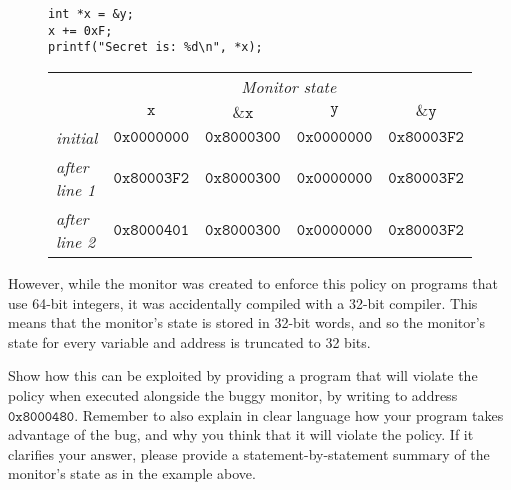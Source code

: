 \documentclass[10pt]{article}
\begin{document}
\begin{enumerate}
\begin{figure}[h]
\begin{minipage}{0.35\textwidth}
\begin{verbatim}
int *x = &y;
x += 0xF;
printf("Secret is: %d\n", *x);
\end{verbatim}
\end{minipage}
\begin{minipage}{0.45\textwidth}
\begin{tabular}{lcccc}
& \multicolumn{4}{c}{\emph{Monitor state}} \\
& $\mathtt{x}$ & $\mathtt{\&x}$ & $\mathtt{y}$ & $\mathtt{\&y}$ \\
\hline
\emph{initial} & $\mathtt{0x0000000}$ & $\mathtt{0x8000300}$ & $\mathtt{0x0000000}$ & $\mathtt{0x80003F2}$ \\
\emph{after line 1} &  $\mathtt{0x80003F2}$ & $\mathtt{0x8000300}$ & $\mathtt{0x0000000}$ & $\mathtt{0x80003F2}$ \\
\emph{after line 2} &  $\mathtt{0x8000401}$ & $\mathtt{0x8000300}$ & $\mathtt{0x0000000}$ & $\mathtt{0x80003F2}$
\end{tabular}
\end{minipage}
\end{figure}

However, while the monitor was created to enforce this policy on programs that use 64-bit integers, it was accidentally compiled with a 32-bit compiler.
This means that the monitor's state is stored in 32-bit words, and so the monitor's state for every variable and address is truncated to 32 bits.

Show how this can be exploited by providing a program that will violate the policy  when executed alongside the buggy monitor, by writing to address $\mathtt{0x8000480}$.
Remember to also explain in clear language how your program takes advantage of the bug, and why you think that it will violate the policy.
If it clarifies your answer, please provide a statement-by-statement summary of the monitor's state as in the example above.

%
\newpage


\end{enumerate}
\end{document}
